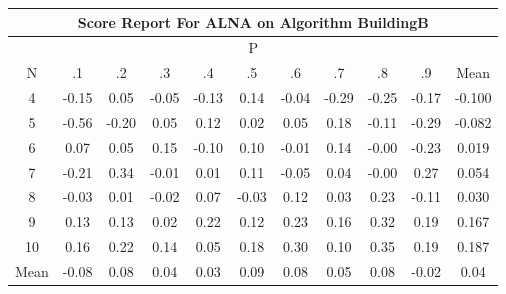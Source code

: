 \documentclass[11pt,a4paper]{report}
\begin{document}
\begin{longtable}{ | c || c | c | c | c | c | c | c | c | c || c |}
\hline
\multicolumn{11}{|c|}{ Score Report For ALNA on Algorithm BuildingB} \\
\hline
\multicolumn{11}{|c|}{ P } \\
\hline
N & .1 & .2 & .3 & .4 & .5 & .6 & .7 & .8 & .9 & Mean\\
 \hline
 \hline
 \endhead
  4 &  \cellcolor[HTML]{FFFFFF} -0.15 &  \cellcolor[HTML]{FFFFFF} 0.05 &  \cellcolor[HTML]{FFFFFF} -0.05 &  \cellcolor[HTML]{FFFFFF} -0.13 &  \cellcolor[HTML]{FFFFFF} 0.14 &  \cellcolor[HTML]{FFFFFF} -0.04 &  \cellcolor[HTML]{FFF7F7} -0.29 &  \cellcolor[HTML]{FFF7F7} -0.25 &  \cellcolor[HTML]{FFF7F7} -0.17 & -0.100 \\
  5 &  \cellcolor[HTML]{FFEFEF} -0.56 &  \cellcolor[HTML]{FFF7F7} -0.20 &  \cellcolor[HTML]{FFFFFF} 0.05 &  \cellcolor[HTML]{FFFFFF} 0.12 &  \cellcolor[HTML]{FFFFFF} 0.02 &  \cellcolor[HTML]{FFFFFF} 0.05 &  \cellcolor[HTML]{F7F7FF} 0.18 &  \cellcolor[HTML]{FFFFFF} -0.11 &  \cellcolor[HTML]{FFF7F7} -0.29 & -0.082 \\
  6 &  \cellcolor[HTML]{FFFFFF} 0.07 &  \cellcolor[HTML]{FFFFFF} 0.05 &  \cellcolor[HTML]{FFFFFF} 0.15 &  \cellcolor[HTML]{FFFFFF} -0.10 &  \cellcolor[HTML]{FFFFFF} 0.10 &  \cellcolor[HTML]{FFFFFF} -0.01 &  \cellcolor[HTML]{FFFFFF} 0.14 &  \cellcolor[HTML]{FFFFFF} -0.00 &  \cellcolor[HTML]{FFF7F7} -0.23 & 0.019 \\
  7 &  \cellcolor[HTML]{FFF7F7} -0.21 &  \cellcolor[HTML]{F7F7FF} 0.34 &  \cellcolor[HTML]{FFFFFF} -0.01 &  \cellcolor[HTML]{FFFFFF} 0.01 &  \cellcolor[HTML]{FFFFFF} 0.11 &  \cellcolor[HTML]{FFFFFF} -0.05 &  \cellcolor[HTML]{FFFFFF} 0.04 &  \cellcolor[HTML]{FFFFFF} -0.00 &  \cellcolor[HTML]{F7F7FF} 0.27 & 0.054 \\
  8 &  \cellcolor[HTML]{FFFFFF} -0.03 &  \cellcolor[HTML]{FFFFFF} 0.01 &  \cellcolor[HTML]{FFFFFF} -0.02 &  \cellcolor[HTML]{FFFFFF} 0.07 &  \cellcolor[HTML]{FFFFFF} -0.03 &  \cellcolor[HTML]{FFFFFF} 0.12 &  \cellcolor[HTML]{FFFFFF} 0.03 &  \cellcolor[HTML]{F7F7FF} 0.23 &  \cellcolor[HTML]{FFFFFF} -0.11 & 0.030 \\
  9 &  \cellcolor[HTML]{FFFFFF} 0.13 &  \cellcolor[HTML]{FFFFFF} 0.13 &  \cellcolor[HTML]{FFFFFF} 0.02 &  \cellcolor[HTML]{F7F7FF} 0.22 &  \cellcolor[HTML]{FFFFFF} 0.12 &  \cellcolor[HTML]{F7F7FF} 0.23 &  \cellcolor[HTML]{F7F7FF} 0.16 &  \cellcolor[HTML]{F7F7FF} 0.32 &  \cellcolor[HTML]{F7F7FF} 0.19 & 0.167 \\
  10 &  \cellcolor[HTML]{FFFFFF} 0.16 &  \cellcolor[HTML]{F7F7FF} 0.22 &  \cellcolor[HTML]{FFFFFF} 0.14 &  \cellcolor[HTML]{FFFFFF} 0.05 &  \cellcolor[HTML]{F7F7FF} 0.18 &  \cellcolor[HTML]{F7F7FF} 0.30 &  \cellcolor[HTML]{FFFFFF} 0.10 &  \cellcolor[HTML]{F7F7FF} 0.35 &  \cellcolor[HTML]{F7F7FF} 0.19 & 0.187 \\
 \hline
 \hline
Mean &  \cellcolor[HTML]{FFFFFF} -0.08 &  \cellcolor[HTML]{FFFFFF} 0.08 &  \cellcolor[HTML]{FFFFFF} 0.04 &  \cellcolor[HTML]{FFFFFF} 0.03 &  \cellcolor[HTML]{FFFFFF} 0.09 &  \cellcolor[HTML]{FFFFFF} 0.08 &  \cellcolor[HTML]{FFFFFF} 0.05 &  \cellcolor[HTML]{FFFFFF} 0.08 &  \cellcolor[HTML]{FFFFFF} -0.02 &  \cellcolor[HTML]{FFFFFF} 0.04
\end{longtable}
\end{document}
